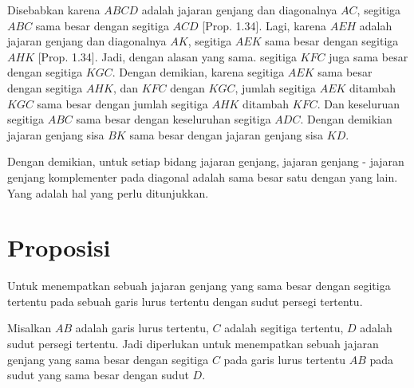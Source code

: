 \documentclass[a4paper]{book}
\begin{document}
Disebabkan karena $ABCD$ adalah jajaran genjang dan diagonalnya $AC$, segitiga
$ABC$ sama besar dengan segitiga $ACD$ [Prop. 1.34]. Lagi, karena $AEH$ adalah
 jajaran genjang dan diagonalnya $AK$, segitiga $AEK$ sama besar dengan 
segitiga $AHK$ [Prop. 1.34]. Jadi, dengan alasan yang sama. segitiga $KFC$ juga
sama besar dengan segitiga $KGC$. Dengan demikian, karena segitiga $AEK$ sama
besar dengan segitiga $AHK$, dan $KFC$ dengan $KGC$, jumlah segitiga $AEK$ 
ditambah $KGC$ sama besar dengan jumlah segitiga $AHK$ ditambah $KFC$. Dan
keseluruan segitiga $ABC$ sama besar dengan keseluruhan segitiga $ADC$. Dengan
demikian jajaran genjang sisa $BK$ sama besar dengan jajaran genjang  sisa 
$KD$.

Dengan demikian, untuk setiap bidang jajaran genjang, jajaran genjang - 
jajaran genjang komplementer pada diagonal adalah sama besar satu dengan yang
lain. Yang adalah hal yang perlu ditunjukkan.

\section*{\centering Proposisi \thesection} 
Untuk menempatkan sebuah jajaran genjang yang sama besar dengan segitiga 
tertentu pada sebuah garis lurus tertentu dengan sudut persegi tertentu.
\begin{center}
\end{center} 
Misalkan $AB$ adalah garis lurus tertentu, $C$ adalah segitiga tertentu, $D$
adalah sudut persegi tertentu. Jadi diperlukan untuk menempatkan sebuah
 jajaran genjang yang sama besar dengan segitiga $C$  pada garis lurus 
tertentu $AB$ pada sudut yang sama besar dengan sudut $D$.
\end{document}
